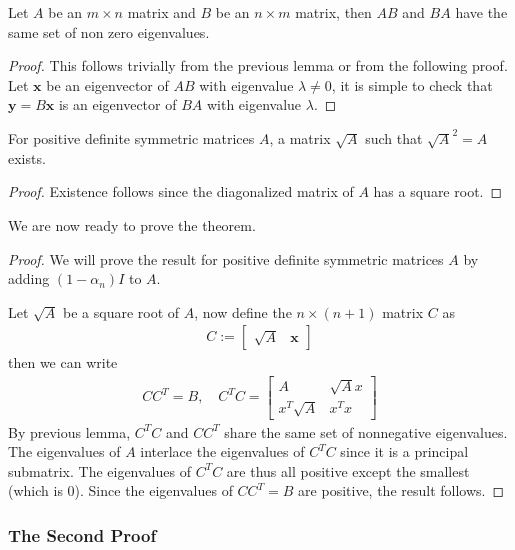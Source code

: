 \documentclass{math}
\renewcommand{\vec}[1]{\boldsymbol{#1}}
\begin{document}
\begin{lemma}
    Let $A$ be an $m \times n$ matrix and $B$ be an $n \times m$ matrix, then $AB$ and $BA$ have the same set of non zero eigenvalues.
\end{lemma}
\begin{proof}
    This follows trivially from the previous lemma or from the following proof.
    Let $\vec{x}$ be an eigenvector of $AB$ with eigenvalue $\lambda \neq 0$, it is simple to check that $\vec{y} = B\vec{x}$ is an eigenvector of $BA$ with eigenvalue $\lambda$.
\end{proof}

\begin{lemma}
    For positive definite symmetric matrices $A$, a matrix $\sqrt{A}$ such that $\sqrt{A}^2 = A$ exists.
\end{lemma}
\begin{proof}
    Existence follows since the diagonalized matrix of $A$ has a square root. 
\end{proof}

We are now ready to prove the theorem.

\begin{proof}
    We will prove the result for positive definite symmetric matrices $A$ by adding $(1 - \alpha_n) I$ to $A$.

    Let $\sqrt{A}$ be a square root of $A$, now define the $n \times (n + 1)$ matrix $C$ as
    \begin{align*}
        C := \begin{bmatrix}
            \sqrt{A} & \vec{x}
        \end{bmatrix}
    \end{align*}
    then we can write
    \begin{align*}
        CC^T = B, \quad C^T C = \begin{bmatrix}
            A & \sqrt{A}x \\
            x^T \sqrt{A} & x^T x
        \end{bmatrix}
    \end{align*}
    By previous lemma, $C^TC$ and $CC^T$ share the same set of nonnegative eigenvalues. The eigenvalues of $A$ interlace the eigenvalues of $C^T C$ since it is a principal submatrix.
    The eigenvalues of $C^TC$ are thus all positive except the smallest (which is $0$). Since the eigenvalues of $CC^T = B$ are positive, the result follows.
\end{proof}

\subsubsection{The Second Proof}
\end{document}
